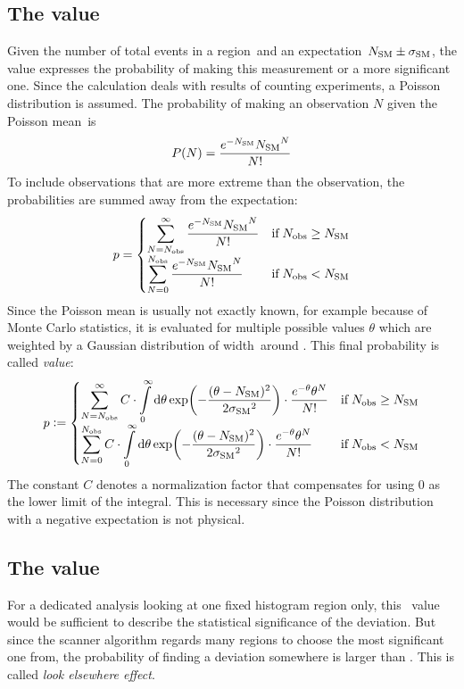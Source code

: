 \subsection{The \p value}
Given the number of total events in a region~\Ndata and an expectation~${N_\mathrm{SM}} \pm {\sigma_\mathrm{SM}}$, the \p value expresses the probability of making this measurement or a more significant one.
Since the calculation deals with results of counting experiments, a Poisson distribution is assumed. The probability of making an observation $N$ given the Poisson mean~\Nmc is
\begin{equation}
	P(N) = \frac{e^{-{N_\mathrm{SM}}} {N_\mathrm{SM}}^N}{N!}
\end{equation}
To include observations that are more extreme than the observation, the probabilities are summed away from the expectation:
\begin{equation}
p = 
	\begin{cases} 
		\displaystyle
		\sum\limits_{N = {N_\mathrm{obs}}}^{\infty} \frac{e^{-{N_\mathrm{SM}}} {N_\mathrm{SM}}^N}{N!} &\mbox{if} \; {N_\mathrm{obs}} \geq {N_\mathrm{SM}} \\
		\displaystyle
		\sum\limits_{N = 0}^{{N_\mathrm{obs}}} \frac{e^{-{N_\mathrm{SM}}} {N_\mathrm{SM}}^N}{N!} &\mbox{if} \; {N_\mathrm{obs}} < {N_\mathrm{SM}}
	\end{cases}
\end{equation}
Since the Poisson mean is usually not exactly known, for example because of Monte Carlo statistics, it is evaluated for multiple possible values $\theta$ which are weighted by a Gaussian distribution of width~\sigmamc around \Nmc. This final probability is called \emph{\p value}:
\begin{equation}
p \vcentcolon= 
	\begin{cases} 
		\displaystyle
		\sum\limits_{N = {N_\mathrm{obs}}}^{\infty} C \cdot \int\limits_0^\infty \dd \theta \exp(-\frac{(\theta-{N_\mathrm{SM}})^2}{2 {\sigma_\mathrm{SM}}^2}) \cdot \frac{e^{-\theta} \theta^N}{N!} &\mbox{if} \; {N_\mathrm{obs}} \geq {N_\mathrm{SM}} \\
		\displaystyle
		\sum\limits_{N = 0}^{{N_\mathrm{obs}}} C \cdot \int\limits_0^\infty \dd \theta \exp(-\frac{(\theta-{N_\mathrm{SM}})^2}{2 {\sigma_\mathrm{SM}}^2}) \cdot \frac{e^{-\theta} \theta^N}{N!} &\mbox{if} \; {N_\mathrm{obs}} < {N_\mathrm{SM}}
	\end{cases}
\end{equation}
The constant $C$ denotes a normalization factor that compensates for using $0$ as the lower limit of the integral. This is necessary since the Poisson distribution with a negative expectation is not physical.

\subsection{The \ptilde value}
For a dedicated analysis looking at one fixed histogram region only, this \p~value would be sufficient to describe the statistical significance of the deviation. But since the scanner algorithm regards many regions to choose the most significant one from, the probability of finding a deviation somewhere is larger than \p. This is called \emph{look elsewhere effect}.

